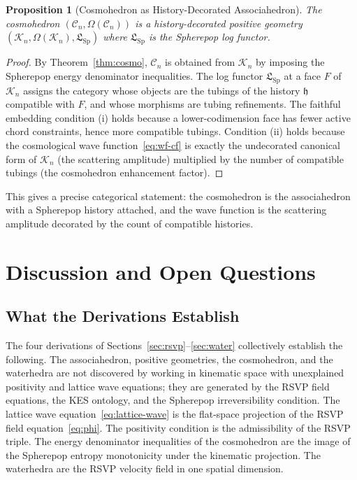 \documentclass[12pt, oneside]{amsart}
\theoremstyle{plain}
\newtheorem{proposition}[theorem]{Proposition}
\theoremstyle{definition}
\theoremstyle{remark}
\newcommand{\hist}{\mathfrak{h}}
\newcommand{\Log}{\mathfrak{L}}
\newcommand{\Assoc}{\mathcal{K}_n}
\newcommand{\Cosmo}{\mathcal{C}_n}
\newcommand{\CF}{\Omega}   %
\begin{document}
\begin{proposition}[Cosmohedron as History-Decorated Associahedron]
\label{prop:cosmo-hdpg}
The cosmohedron $(\Cosmo, \CF(\Cosmo))$ is a history-decorated positive geometry $(\Assoc, \CF(\Assoc), \Log_{\text{Sp}})$ where $\Log_{\text{Sp}}$ is the Spherepop log functor.
\end{proposition}

\begin{proof}
By Theorem~\ref{thm:cosmo}, $\Cosmo$ is obtained from $\Assoc$ by imposing the Spherepop energy denominator inequalities. The log functor $\Log_{\text{Sp}}$ at a face $F$ of $\Assoc$ assigns the category whose objects are the tubings of the history $\hist$ compatible with $F$, and whose morphisms are tubing refinements. The faithful embedding condition (i) holds because a lower-codimension face has fewer active chord constraints, hence more compatible tubings. Condition (ii) holds because the cosmological wave function~\eqref{eq:wf-cf} is exactly the undecorated canonical form of $\Assoc$ (the scattering amplitude) multiplied by the number of compatible tubings (the cosmohedron enhancement factor).
\end{proof}

This gives a precise categorical statement: the cosmohedron is the associahedron with a Spherepop history attached, and the wave function is the scattering amplitude decorated by the count of compatible histories.

\section{Discussion and Open Questions}
\label{sec:discussion}

\subsection{What the Derivations Establish}

The four derivations of Sections~\ref{sec:rsvp}--\ref{sec:water} collectively establish the following. The associahedron, positive geometries, the cosmohedron, and the waterhedra are not discovered by working in kinematic space with unexplained positivity and lattice wave equations; they are generated by the RSVP field equations, the KES ontology, and the Spherepop irreversibility condition. The lattice wave equation~\eqref{eq:lattice-wave} is the flat-space projection of the RSVP field equation~\eqref{eq:phi}. The positivity condition is the admissibility of the RSVP triple. The energy denominator inequalities of the cosmohedron are the image of the Spherepop entropy monotonicity under the kinematic projection. The waterhedra are the RSVP velocity field in one spatial dimension.
\end{document}
